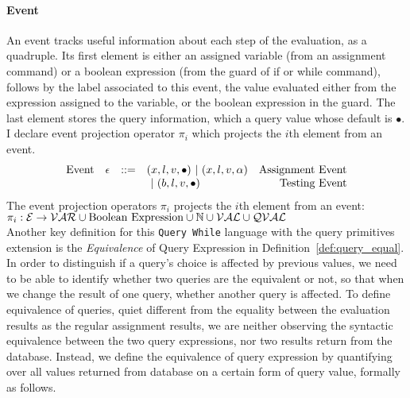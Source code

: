 \paragraph{Event}
An event tracks useful information about each step of the evaluation, as a quadruple. Its first element is either 
an assigned variable (from an assignment command) or a boolean expression (from the guard of if or while command), follows by 
 the label associated to this event, the value evaluated either from the expression assigned to the variable,
or the boolean expression in the guard.
 The last element stores the query information, which a query value whose default is $\bullet$. I declare event projection operator $\pi_i$ which projects the $i$th element from an event.
%
\[
\begin{array}{llllr}
\mbox{Event} 
& \mathtt{\epsilon} & ::= & 
    ({x}, l, v, \bullet) ~|~ ({x}, l, v, \alpha)  & \mbox{Assignment Event} \\
& & & 
~|~(b, l, v, \bullet)   
&
\mbox{Testing Event}
\end{array}
\]
%
The event projection operators $\pi_i$ projects the $i$th element from an event: 
\\
$\pi_i : 
\mathcal{E} \to \mathcal{VAR}\cup \mbox{Boolean Expression}  \cup \mathbb{N} \cup \mathcal{VAL} \cup \mathcal{QVAL} $ 
\\
%
Another key definition for this {\tt Query While} language with the query primitives extension is the 
\emph{Equivalence} of Query Expression in Definition~\ref{def:query_equal}.
In order to distinguish if a query's choice is affected by previous values, 
we need to be able to identify whether two queries are the equivalent or not, so that when we change the result of one query, 
whether another query is affected. 
To define equivalence of queries,
quiet different from the equality between the evaluation results as the regular assignment results, 
we are neither observing the syntactic equivalence between the two query expressions,
nor two results return from the database. 
Instead, we define the equivalence of query expression by quantifying over all values returned from database on a certain form of query value, formally as follows.

